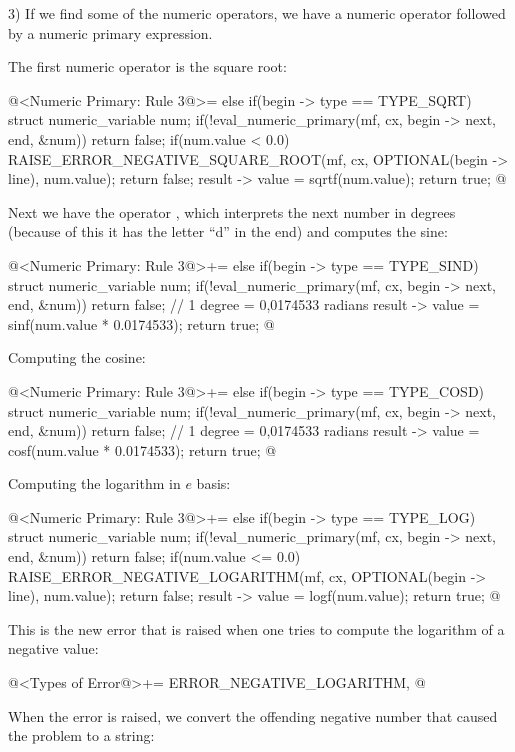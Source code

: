 3) If we find some of the numeric operators, we have a numeric
operator followed by a numeric primary expression.



The first numeric operator is the square root:

\iniciocodigo
@<Numeric Primary: Rule 3@>=
else if(begin -> type == TYPE_SQRT){
  struct numeric_variable num;
  if(!eval_numeric_primary(mf, cx, begin -> next, end, &num))
    return false;
  if(num.value < 0.0){
    RAISE_ERROR_NEGATIVE_SQUARE_ROOT(mf, cx, OPTIONAL(begin -> line),
                                    num.value);
    return false;
  }
  result -> value = sqrtf(num.value);
  return true;
}
@
\fimcodigo

Next we have the operator , which interprets the next
number in degrees (because of this it has the letter ``d'' in the end)
and computes the sine:

\iniciocodigo
@<Numeric Primary: Rule 3@>+=
else if(begin -> type == TYPE_SIND){
  struct numeric_variable num;
  if(!eval_numeric_primary(mf, cx, begin -> next, end, &num))
    return false;
  // 1 degree = 0,0174533 radians
  result -> value = sinf(num.value * 0.0174533);
  return true;
}
@
\fimcodigo

Computing the cosine:

\iniciocodigo
@<Numeric Primary: Rule 3@>+=
else if(begin -> type == TYPE_COSD){
  struct numeric_variable num;
  if(!eval_numeric_primary(mf, cx, begin -> next, end, &num))
    return false;
  // 1 degree = 0,0174533 radians
  result -> value = cosf(num.value * 0.0174533);
  return true;
}
@
\fimcodigo

Computing the logarithm in $e$ basis:

\iniciocodigo
@<Numeric Primary: Rule 3@>+=
else if(begin -> type == TYPE_LOG){
  struct numeric_variable num;
  if(!eval_numeric_primary(mf, cx, begin -> next, end, &num))
    return false;
  if(num.value <= 0.0){
    RAISE_ERROR_NEGATIVE_LOGARITHM(mf, cx, OPTIONAL(begin -> line),
                                   num.value);
    return false;
  }
  result -> value = logf(num.value);
  return true;
}
@
\fimcodigo

This is the new error that is raised when one tries to compute the
logarithm of a negative value:

\iniciocodigo
@<Types of Error@>+=
ERROR_NEGATIVE_LOGARITHM,
@
\fimcodigo

When the error is raised, we convert the offending negative number
that caused the problem to a string:

